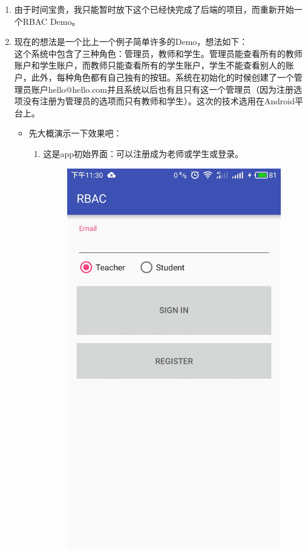 \begin{itemize}
\begin{enumerate}
		\item
		由于时间宝贵，我只能暂时放下这个已经快完成了后端的项目，而重新开始一个RBAC Demo。
		
		\item
		现在的想法是一个比上一个例子简单许多的Demo，想法如下：\\ 这个系统中包含了三种角色：管理员，教师和学生。管理员能查看所有的教师账户和学生账户，而教师只能查看所有的学生账户，学生不能查看别人的账户，此外，每种角色都有自己独有的按钮。系统在初始化的时候创建了一个管理员账户hello@hello.com并且系统以后也有且只有这一个管理员（因为注册选项没有注册为管理员的选项而只有教师和学生）。这次的技术选用在Android平台上。
		\begin{itemize}
			\item 先大概演示一下效果吧：
			\begin{enumerate}
				\item 这是app初始界面：可以注册成为老师或学生或登录。
				\begin{figure}[H]
					\centering
					\includegraphics[height=0.3\textheight]{snapshot/1}

\end{figure}
\end{enumerate}
\end{itemize}
\end{enumerate}
\end{itemize}
